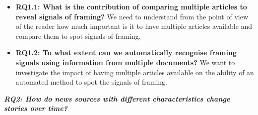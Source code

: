 \begin{itemize}
    
    \item \textbf{RQ1.1: What is the contribution of comparing multiple articles to reveal signals of framing?}
    We need to understand from the point of view of the reader how much important is it to have multiple articles available and compare them to spot signals of framing. 
    
    
    \item \textbf{RQ1.2: To what extent can we automatically recognise framing signals using information from multiple documents?}
    We want to investigate the impact of having multiple articles available on the ability of an automated method to spot the signals of framing.
    
\end{itemize}


\vspace{12px}

\textit{\textbf{RQ2: How do news sources with different characteristics change stories over time?}}

